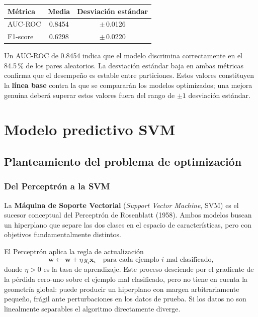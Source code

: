 \documentclass[spanish]{article}
\begin{document}
\begin{center}
\begin{tabular}{lcc}
\toprule
\textbf{Métrica} & \textbf{Media} & \textbf{Desviación estándar} \\
\midrule
AUC-ROC  & 0.8454 & $\pm$\,0.0126 \\
F1-score & 0.6298 & $\pm$\,0.0220 \\
\bottomrule
\end{tabular}
\end{center}

Un AUC-ROC de 0.8454 indica que el modelo discrimina correctamente en el 84.5\,\% de los pares aleatorios. La desviación estándar baja en ambas métricas confirma que el desempeño es estable entre particiones. Estos valores constituyen la \textbf{línea base} contra la que se compararán los modelos optimizados; una mejora genuina deberá superar estos valores fuera del rango de $\pm 1$ desviación estándar.




\section{Modelo predictivo SVM}

\subsection{Planteamiento del problema de optimización}

\subsubsection{Del Perceptrón a la SVM}

La \textbf{Máquina de Soporte Vectorial} (\textit{Support Vector Machine}, SVM) es el sucesor conceptual del Perceptrón de Rosenblatt (1958). Ambos modelos buscan un hiperplano que separe las dos clases en el espacio de características, pero con objetivos fundamentalmente distintos.

El Perceptrón aplica la regla de actualización
\begin{equation}
\mathbf{w} \leftarrow \mathbf{w} + \eta\, y_i \mathbf{x}_i \quad \text{para cada ejemplo } i \text{ mal clasificado,}
\end{equation}
donde $\eta > 0$ es la tasa de aprendizaje. Este proceso desciende por el gradiente de la pérdida cero-uno sobre el ejemplo mal clasificado, pero no tiene en cuenta la geometría global: puede producir un hiperplano con margen arbitrariamente pequeño, frágil ante perturbaciones en los datos de prueba. Si los datos no son linealmente separables el algoritmo directamente diverge.
\end{document}
